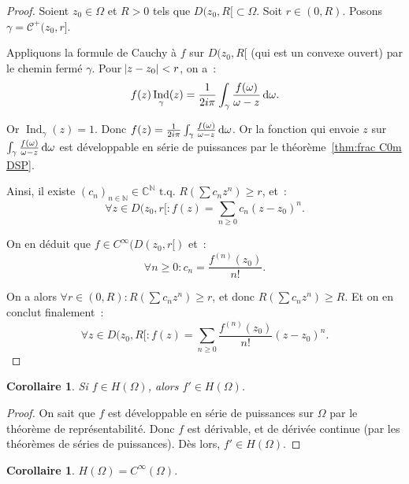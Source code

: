 \documentclass{report}
\newtheorem{cor}[thm]{Corollaire}
\theoremstyle{definition}
\theoremstyle{remark}
\numberwithin{equation}{section}
\newcommand{\C}{\mathbb C}
\newcommand{\N}{\mathbb N}
\newcommand{\tq}{\text{ t.q. }}
\DeclareMathOperator{\Ind}{Ind}
\begin{document}
			\begin{proof} Soient $z_0 \in \Omega$ et $R > 0$ tels que $D(z_0, R[ \subset \Omega$. Soit $r \in (0, R)$. Posons $\gamma = \mathcal C^+(z_0, r]$.

			Appliquons la formule de Cauchy à $f$ sur $D(z_0, R[$ (qui est un convexe ouvert) par le chemin fermé $\gamma$. Pour $\abs {z-z_0} < r$, on a~:
			\begin{equation}
				f(z)\Ind_\gamma(z) = \frac 1{2i\pi}\int_\gamma \frac {f(\omega)}{\omega - z}\dif \omega.
			\end{equation}

			Or $\Ind_\gamma(z) = 1$. Donc $f(z) = \frac 1{2i\pi}\int_\gamma \frac {f(\omega)}{\omega - z}\dif \omega$. Or la fonction qui envoie $z$ sur
			$\int_\gamma\frac {f(\omega)}{\omega-z}\dif \omega$ est développable en série de puissances par le théorème~\ref{thm:frac C0m DSP}.

			Ainsi, il existe $(c_n)_{n \in \N} \in \C^\N \tq R(\sum c_nz^n) \geq r$, et~:
			\begin{equation}
				\forall z \in D(z_0, r[ : f(z) = \sum_{n \geq 0}c_n(z-z_0)^n.
			\end{equation}

			On en déduit que $f \in C^\infty(D(z_0, r[)$ et~:
			\begin{equation}
				\forall n \geq 0 : c_n = \frac {f^{(n)}(z_0)}{n!}.
			\end{equation}

			On a alors $\forall r \in (0, R) : R(\sum c_nz^n) \geq r$, et donc $R(\sum c_nz^n) \geq R$. Et on en conclut finalement~:
			\begin{equation}
				\forall z \in D(z_0, R[ : f(z) = \sum_{n \geq 0}\frac {f^{(n)}(z_0)}{n!}(z-z_0)^n.
			\end{equation}
			\end{proof}

			\begin{cor} Si $f \in H(\Omega)$, alors $f' \in H(\Omega)$.
			\end{cor}

			\begin{proof} On sait que $f$ est développable en série de puissances sur $\Omega$ par le théorème de représentabilité. Donc $f$ est dérivable,
			et de dérivée continue (par les théorèmes de séries de puissances). Dès lors, $f' \in H(\Omega)$.
			\end{proof}

			\begin{cor} $H(\Omega) = C^\infty(\Omega)$.
			\end{cor}
\end{document}
